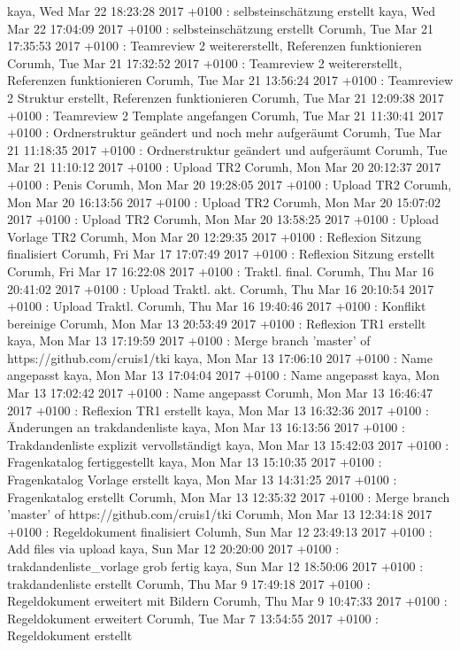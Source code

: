 kaya, Wed Mar 22 18:23:28 2017 +0100 : selbsteinschätzung erstellt
kaya, Wed Mar 22 17:04:09 2017 +0100 : selbsteinschätzung erstellt
Corumh, Tue Mar 21 17:35:53 2017 +0100 : Teamreview 2 weitererstellt, Referenzen funktionieren
Corumh, Tue Mar 21 17:32:52 2017 +0100 : Teamreview 2 weitererstellt, Referenzen funktionieren
Corumh, Tue Mar 21 13:56:24 2017 +0100 : Teamreview 2 Struktur erstellt, Referenzen funktionieren
Corumh, Tue Mar 21 12:09:38 2017 +0100 : Teamreview 2 Template angefangen
Corumh, Tue Mar 21 11:30:41 2017 +0100 : Ordnerstruktur geändert und noch mehr aufgeräumt
Corumh, Tue Mar 21 11:18:35 2017 +0100 : Ordnerstruktur geändert und aufgeräumt
Corumh, Tue Mar 21 11:10:12 2017 +0100 : Upload TR2
Corumh, Mon Mar 20 20:12:37 2017 +0100 : Penis
Corumh, Mon Mar 20 19:28:05 2017 +0100 : Upload TR2
Corumh, Mon Mar 20 16:13:56 2017 +0100 : Upload TR2
Corumh, Mon Mar 20 15:07:02 2017 +0100 : Upload TR2
Corumh, Mon Mar 20 13:58:25 2017 +0100 : Upload Vorlage TR2
Corumh, Mon Mar 20 12:29:35 2017 +0100 : Reflexion Sitzung finalisiert
Corumh, Fri Mar 17 17:07:49 2017 +0100 : Reflexion Sitzung erstellt
Corumh, Fri Mar 17 16:22:08 2017 +0100 : Traktl. final.
Corumh, Thu Mar 16 20:41:02 2017 +0100 : Upload Traktl. akt.
Corumh, Thu Mar 16 20:10:54 2017 +0100 : Upload Traktl.
Corumh, Thu Mar 16 19:40:46 2017 +0100 : Konflikt bereinige
Corumh, Mon Mar 13 20:53:49 2017 +0100 : Reflexion TR1 erstellt
kaya, Mon Mar 13 17:19:59 2017 +0100 : Merge branch 'master' of https://github.com/cruis1/tki
kaya, Mon Mar 13 17:06:10 2017 +0100 : Name angepasst
kaya, Mon Mar 13 17:04:04 2017 +0100 : Name angepasst
kaya, Mon Mar 13 17:02:42 2017 +0100 : Name angepasst
Corumh, Mon Mar 13 16:46:47 2017 +0100 : Reflexion TR1 erstellt
kaya, Mon Mar 13 16:32:36 2017 +0100 : Änderungen an trakdandenliste
kaya, Mon Mar 13 16:13:56 2017 +0100 : Trakdandenliste explizit vervollständigt
kaya, Mon Mar 13 15:42:03 2017 +0100 : Fragenkatalog fertiggestellt
kaya, Mon Mar 13 15:10:35 2017 +0100 : Fragenkatalog Vorlage erstellt
kaya, Mon Mar 13 14:31:25 2017 +0100 : Fragenkatalog erstellt
Corumh, Mon Mar 13 12:35:32 2017 +0100 : Merge branch 'master' of https://github.com/cruis1/tki
Corumh, Mon Mar 13 12:34:18 2017 +0100 : Regeldokument finalisiert
Columh, Sun Mar 12 23:49:13 2017 +0100 : Add files via upload
kaya, Sun Mar 12 20:20:00 2017 +0100 : trakdandenliste_vorlage grob fertig
kaya, Sun Mar 12 18:50:06 2017 +0100 : trakdandenliste erstellt
Corumh, Thu Mar 9 17:49:18 2017 +0100 : Regeldokument erweitert mit Bildern
Corumh, Thu Mar 9 10:47:33 2017 +0100 : Regeldokument erweitert
Corumh, Tue Mar 7 13:54:55 2017 +0100 : Regeldokument erstellt

